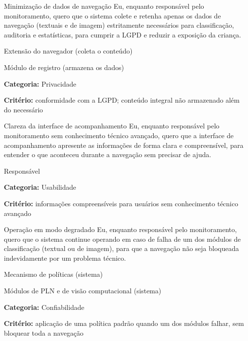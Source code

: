 \documentclass[
    12pt,           %
    oneside,        %
    a4paper,        %
    chapter=TITLE,  %
    english,        %
    brazil          %
]{abntex2}
\begin{document}
{Minimização de dados de navegação}
{Eu, enquanto responsável pelo monitoramento, quero que o sistema colete e retenha apenas os dados de navegação (textuais e de imagem) estritamente necessários para classificação, auditoria e estatísticas, para cumprir a LGPD e reduzir a exposição da criança.}
{\begin{dadoslista}
\item Extensão do navegador (coleta o conteúdo)
\item Módulo de registro (armazena os dados)
\end{dadoslista}}
{\begin{dadoslista}
\item \textbf{Categoria:} Privacidade
\item \textbf{Critério:} conformidade com a LGPD; conteúdo integral não armazenado além do necessário
\end{dadoslista}}

{Clareza da interface de acompanhamento}
{Eu, enquanto responsável pelo monitoramento sem conhecimento técnico avançado, quero que a interface de acompanhamento apresente as informações de forma clara e compreensível, para entender o que aconteceu durante a navegação sem precisar de ajuda.}
{\begin{dadoslista}
\item Responsável
\end{dadoslista}}
{\begin{dadoslista}
\item \textbf{Categoria:} Usabilidade
\item \textbf{Critério:} informações compreensíveis para usuários sem conhecimento técnico avançado
\end{dadoslista}}

{Operação em modo degradado}
{Eu, enquanto responsável pelo monitoramento, quero que o sistema continue operando em caso de falha de um dos módulos de classificação (textual ou de imagem), para que a navegação não seja bloqueada indevidamente por um problema técnico.}
{\begin{dadoslista}
\item Mecanismo de políticas (sistema)
\item Módulos de PLN e de visão computacional (sistema)
\end{dadoslista}}
{\begin{dadoslista}
\item \textbf{Categoria:} Confiabilidade
\item \textbf{Critério:} aplicação de uma política padrão quando um dos módulos falhar, sem bloquear toda a navegação
\end{dadoslista}}
\end{document}
